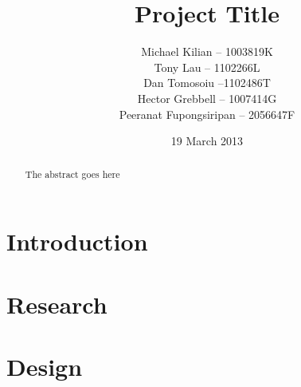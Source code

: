 \documentclass{l3proj}
\begin{document}
\title{Project Title}
\author{Michael Kilian -- 1003819K \\
        Tony Lau -- 1102266L\\
        Dan Tomosoiu --1102486T \\
        Hector Grebbell -- 1007414G \\
        Peeranat Fupongsiripan -- 2056647F}
\date{19 March 2013}
\maketitle
\begin{abstract}

The abstract goes here

\end{abstract}
\educationalconsent
\tableofcontents
\chapter{Introduction}
\label{intro}



%


\chapter{Research}
\label{research}





\chapter{Design}
\label{design}


\end{document}
